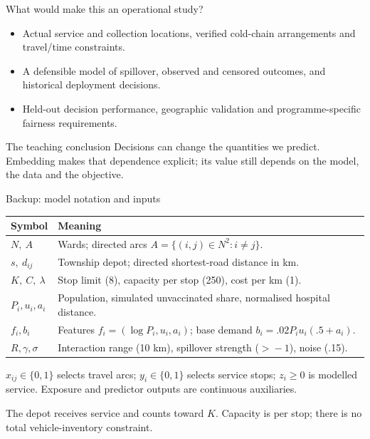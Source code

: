 \begin{frame}{What would make this an operational study?}
  \begin{itemize}
    \item Actual service and collection locations, verified cold-chain arrangements and travel/time constraints.
    \item A defensible model of spillover, observed and censored outcomes, and historical deployment decisions.
    \item Held-out decision performance, geographic validation and programme-specific fairness requirements.
  \end{itemize}
  \vspace{4mm}
  \begin{block}{The teaching conclusion}
    Decisions can change the quantities we predict. Embedding makes that dependence explicit; its value still depends on the model, the data and the objective.
  \end{block}
  \small {}
\end{frame}

\appendix
\begin{frame}{Backup: model notation and inputs}
  \small
  \begin{tabular}{lp{}}
    \toprule
    Symbol & Meaning\\\midrule
    $N,\ A$ & Wards; directed arcs $A=\{(i,j)\in N^2:i\ne j\}$.\\[1mm]
    $s,\ d_{ij}$ & Township depot; directed shortest-road distance in km.\\[1mm]
    $K,\ C,\ \lambda$ & Stop limit (8), capacity per stop (250), cost per km (1).\\[1mm]
    $P_i,u_i,a_i$ & Population, simulated unvaccinated share, normalised hospital distance.\\[1mm]
    $f_i,b_i$ & Features $f_i=(\log P_i,u_i,a_i)$; base demand $b_i=.02P_i u_i(.5+a_i)$.\\[1mm]
    $R,\gamma,\sigma$ & Interaction range (10 km), spillover strength ($>\!-1$), noise (.15).\\
    \bottomrule
  \end{tabular}\par\vspace{3mm}
  $x_{ij}\in\{0,1\}$ selects travel arcs; $y_i\in\{0,1\}$ selects service stops;
  $z_i\ge0$ is modelled service. Exposure and predictor outputs are continuous auxiliaries.
  \par\vspace{2mm}
  The depot receives service and counts toward $K$. Capacity is per stop; there is no total vehicle-inventory constraint.
\end{frame}

